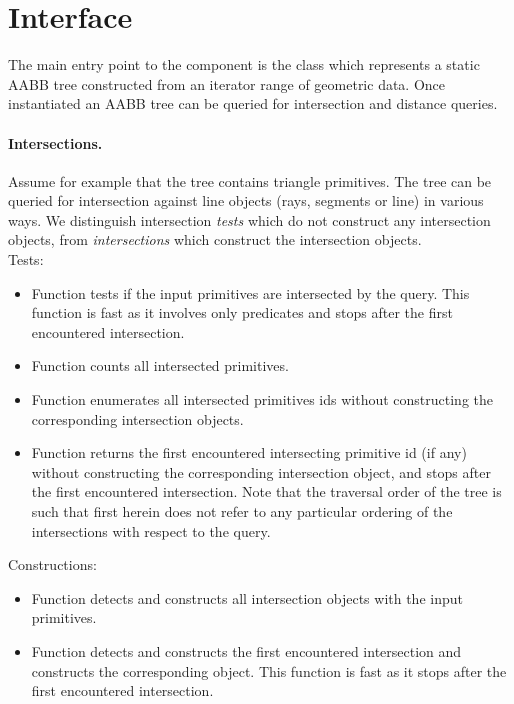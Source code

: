 \section{Interface}
\label{AABB_tree_section_interface}

The main entry point to the component is the class  which represents a static AABB tree constructed from an iterator range of geometric data. Once instantiated an AABB tree can be queried for intersection and distance queries.\\

\paragraph{Intersections.} Assume for example that the tree contains triangle primitives. The tree can be queried for intersection against line objects (rays, segments or line) in various ways. We distinguish intersection \emph{tests} which do not construct any intersection objects, from \emph{intersections} which construct the intersection objects.\\

Tests:
\begin{itemize}
\item Function  tests if the input primitives are intersected by the query. This function is fast as it involves only predicates and stops after the first encountered intersection.
\item Function  counts all intersected primitives.
\item Function  enumerates all intersected primitives ids without constructing the corresponding intersection objects.
\item Function  returns the first encountered intersecting primitive id (if any) without constructing the corresponding intersection object, and stops after the first encountered intersection. Note that the traversal order of the tree is such that first herein does not refer to any particular ordering of the intersections with respect to the query.
\end{itemize}

Constructions:
\begin{itemize}
\item Function  detects and constructs all intersection objects with the input primitives.
\item Function  detects and constructs the first encountered intersection and constructs the corresponding object. This function is fast as it stops after the first encountered intersection.
\end{itemize}

